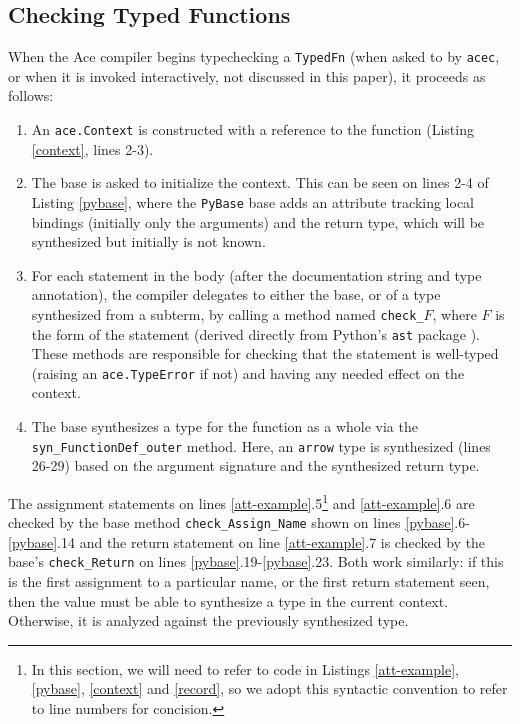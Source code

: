 {\subsection{Checking Typed Functions}
When the Ace compiler begins typechecking a \verb|TypedFn| (when asked to by \verb|acec|, or when it is  invoked interactively, not discussed in this paper), it proceeds as follows:
\begin{enumerate}
\item An \verb|ace.Context| is constructed with a reference to the function (Listing \ref{context}, lines 2-3).
\item The base is asked to initialize the context. This can be seen on lines 2-4 of Listing \ref{pybase}, where the \verb|PyBase| base adds an attribute tracking local bindings (initially only the arguments) and the return type, which will be synthesized but initially is not known. 
\item For each statement in the body (after the documentation string and type annotation), the compiler delegates to either the base, or of a type synthesized from a subterm, by calling a method named \verb|check_|$F$, where $F$ is the form of the statement (derived directly from Python's \verb|ast| package \cite{python}). These methods are responsible for checking that the statement is well-typed (raising an \verb|ace.TypeError| if not) and having any needed effect on the context. 
\item The base synthesizes a type for the function as a whole via the \verb|syn_FunctionDef_outer| method. Here, an \verb|arrow| type is synthesized (lines 26-29) based on the argument signature and the synthesized return type.
\end{enumerate}
The assignment statements on lines \ref{att-example}.5\footnote{In this section, we will need to refer to code in Listings \ref{att-example}, \ref{pybase}, \ref{context} and \ref{record}, so we adopt this syntactic convention to refer to line numbers for concision.} and \ref{att-example}.6 are checked by the base method \verb|check_Assign_Name| shown on lines \ref{pybase}.6-\ref{pybase}.14 and the return statement on line \ref{att-example}.7 is checked by the base's \verb|check_Return| on lines \ref{pybase}.19-\ref{pybase}.23. Both work similarly: if this is the first assignment to a particular name, or the first return statement seen, then the value must be able to synthesize a type in the current context. Otherwise, it is analyzed against the previously synthesized type.

}
